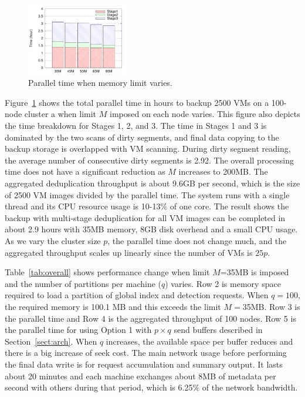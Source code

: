\begin{figure}
\centering
\includegraphics[width=0.4\textwidth]{mem_time.pdf}
\caption{ Parallel time when memory limit varies.}
\label{fig:memory}
\end{figure}

Figure~\ref{fig:memory} shows the total parallel time in hours to backup 2500 VMs on
 a 100-node cluster a  when 
limit $M$ imposed on each node varies.
This figure also depicts the time breakdown for Stages 1, 2, and 3. 
The time in Stages 1 and 3  is  dominated by  the two scans of dirty segments,
and final data copying to the backup storage is overlapped with VM scanning.
During dirty segment reading, the average number of consecutive dirty segments is 2.92. 
The overall processing time does not have a significant reduction as $M$ increases to 200MB.
The aggregated deduplication throughput is  about 9.6GB per second,
which is the size of 2500 VM images divided by the parallel time. 
The system runs with  a single thread and  its CPU resource usage is 10-13\% of one core. 
The result shows the backup with multi-stage deduplication  for all VM images can be 
completed in about 2.9 hours with 35MB memory,  8GB disk overhead and a small CPU usage.
As we vary the cluster size $p$,  the parallel time does  not change much, and  the aggregated throughput
scales up linearly since the number of VMs is  $25p$. 

Table~\ref{tab:overall} shows performance change when limit $M$=35MB is imposed and
the number of partitions per machine ($q$) varies.
Row 2 is memory space required to load a partition of global index and detection requests.
When $q=100$, the required memory is 100.1 MB and this exceeds the limit $M=$35MB.  
Row 3 is the parallel time and Row 4 is  the aggregated throughput of  100 nodes.
Row 5 is  the parallel time for using Option 1 with $p\times q$ send buffers 
described in Section~\ref{sect:arch}. 
When $q$ increases, the available space per buffer reduces and there is a big increase of seek cost.  
The main network usage before performing the final data write is for request accumulation and
summary output. It lasts about 20 minutes and each machine exchanges 
about   8MB of metadata per second with others during that period, which is 6.25\% of the network bandwidth.

